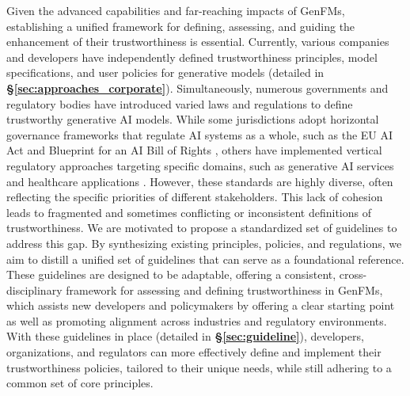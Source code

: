 Given the advanced capabilities and far-reaching impacts of GenFMs, establishing a unified framework for defining, assessing, and guiding the enhancement of their trustworthiness is essential. Currently, various companies and developers have independently defined trustworthiness principles, model specifications, and user policies for generative models (detailed in \textbf{\S\ref{sec:approaches_corporate}}). Simultaneously, numerous governments and regulatory bodies have introduced varied laws and regulations to define trustworthy generative AI models. While some jurisdictions adopt horizontal governance frameworks that regulate AI systems as a whole, such as the EU AI Act \cite{eu_ai_act} and Blueprint for an AI Bill of Rights \cite{BlueprintAIBill2022}, others have implemented vertical regulatory approaches targeting specific domains, such as generative AI services \cite{china_gen_ai_regulations} and healthcare applications \cite{wto2024lmm}. However, these standards are highly diverse, often reflecting the specific priorities of different stakeholders. This lack of cohesion leads to fragmented and sometimes conflicting or inconsistent definitions of trustworthiness. We are motivated to propose a standardized set of guidelines to address this gap. By synthesizing existing principles, policies, and regulations, we aim to distill a unified set of guidelines that can serve as a foundational reference. These guidelines are designed to be adaptable, offering a consistent, cross-disciplinary framework for assessing and defining trustworthiness in GenFMs, which assists new developers and policymakers by offering a clear starting point as well as promoting alignment across industries and regulatory environments. With these guidelines in place (detailed in \textbf{\S\ref{sec:guideline}}), developers, organizations, and regulators can more effectively define and implement their trustworthiness policies, tailored to their unique needs, while still adhering to a common set of core principles.


